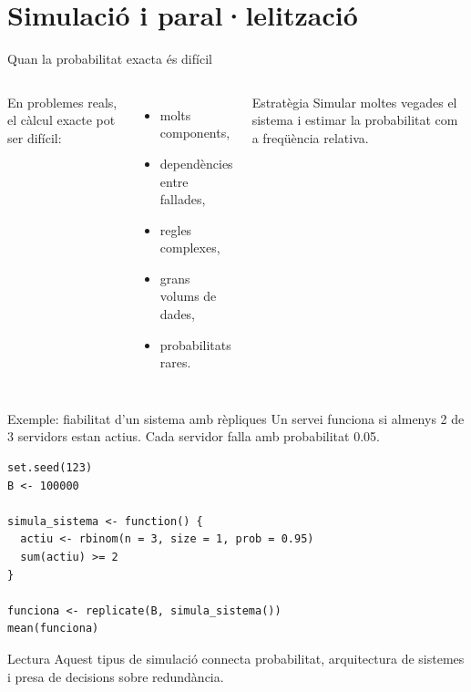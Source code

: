 \documentclass[10pt,aspectratio=169]{beamer}
\begin{document}
\section{Simulació i paral·lelització}

\begin{frame}{Quan la probabilitat exacta és difícil}
\begin{columns}[T]
En problemes reals, el càlcul exacte pot ser difícil:
\begin{itemize}
  \item molts components,
  \item dependències entre fallades,
  \item regles complexes,
  \item grans volums de dades,
  \item probabilitats rares.
\end{itemize}
\vspace{0.1cm}
\begin{block}{Estratègia}
Simular moltes vegades el sistema i estimar la probabilitat com a freqüència relativa.
\end{block}
\end{columns}
\end{frame}

\begin{frame}[fragile]{Exemple: fiabilitat d'un sistema amb rèpliques}
Un servei funciona si almenys 2 de 3 servidors estan actius. Cada servidor falla amb probabilitat 0.05.
\begin{lstlisting}
set.seed(123)
B <- 100000

simula_sistema <- function() {
  actiu <- rbinom(n = 3, size = 1, prob = 0.95)
  sum(actiu) >= 2
}

funciona <- replicate(B, simula_sistema())
mean(funciona)
\end{lstlisting}
\vspace{0.1cm}
\begin{block}{Lectura}
Aquest tipus de simulació connecta probabilitat, arquitectura de sistemes i presa de decisions sobre redundància.
\end{block}
\end{frame}
\end{document}

